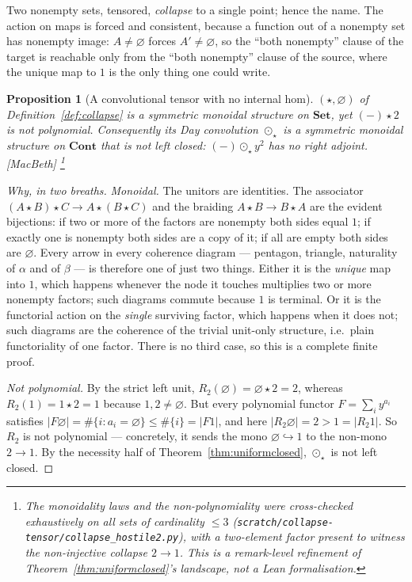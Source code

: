 \documentclass[11pt,a4paper]{book}
\newcommand{\Set}{\mathbf{Set}}
\newcommand{\Cont}{\mathbf{Cont}}
\theoremstyle{plain}
\newtheorem{Proposition}[Theorem]{Proposition}
\theoremstyle{definition}
\theoremstyle{remark}
\newcommand{\prov}[1]{\hfill\textsf{\footnotesize[#1]}}
\begin{document}
Two nonempty sets, tensored, \emph{collapse} to a single point; hence the name.
The action on maps is forced and consistent, because a function out of a nonempty
set has nonempty image: $A\neq\varnothing$ forces $A'\neq\varnothing$, so the
``both nonempty'' clause of the target is reachable only from the ``both
nonempty'' clause of the source, where the unique map to $1$ is the only thing one
could write.

\begin{Proposition}[A convolutional tensor with no internal hom]\label{prop:collapse}
$(\star,\varnothing)$ of Definition~\ref{def:collapse} is a symmetric monoidal
structure on $\Set$, yet $(-)\star 2$ is not polynomial. Consequently its Day
convolution $\odot_\star$ is a symmetric monoidal structure on $\Cont$ that is
\emph{not} left closed: $(-)\odot_\star y^2$ has no right adjoint.
\prov{MacBeth}%
\footnote{The monoidality laws and the non-polynomiality were cross-checked
exhaustively on all sets of cardinality $\le 3$
(\texttt{scratch/collapse-tensor/collapse\_hostile2.py}), with a two-element
factor present to witness the non-injective collapse $2\to 1$. This is a
remark-level refinement of Theorem~\ref{thm:uniformclosed}'s landscape, not a Lean
formalisation.}
\end{Proposition}

\begin{proof}[Why, in two breaths]
\emph{Monoidal.} The unitors are identities. The associator
$(A\star B)\star C\to A\star(B\star C)$ and the braiding $A\star B\to B\star A$ are
the evident bijections: if two or more of the factors are nonempty both sides
equal $1$; if exactly one is nonempty both sides are a copy of it; if all are
empty both sides are $\varnothing$. Every arrow in every coherence diagram ---
pentagon, triangle, naturality of $\alpha$ and of $\beta$ --- is therefore one of
just two things. Either it is the \emph{unique} map into $1$, which happens
whenever the node it touches multiplies two or more nonempty factors; such
diagrams commute because $1$ is terminal. Or it is the functorial action on the
\emph{single} surviving factor, which happens when it does not; such diagrams are
the coherence of the trivial unit-only structure, i.e.\ plain functoriality of one
factor. There is no third case, so this is a complete finite proof.

\emph{Not polynomial.} By the strict left unit, $R_2(\varnothing)=\varnothing\star
2=2$, whereas $R_2(1)=1\star 2=1$ because $1,2\neq\varnothing$. But every
polynomial functor $F=\sum_i y^{a_i}$ satisfies
$|F\varnothing|=\#\{i:a_i=\varnothing\}\le\#\{i\}=|F1|$, and here
$|R_2\varnothing|=2>1=|R_2 1|$. So $R_2$ is not polynomial --- concretely, it
sends the mono $\varnothing\hookrightarrow 1$ to the non-mono $2\to 1$. By the
necessity half of Theorem~\ref{thm:uniformclosed}, $\odot_\star$ is not left
closed.
\end{proof}
\end{document}
